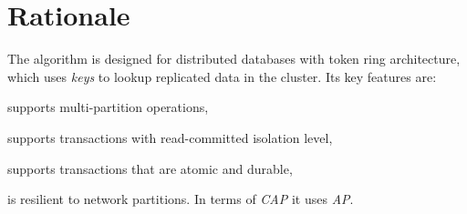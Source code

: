 
\section{Rationale}
The \mpt algorithm is designed for distributed databases with token ring architecture,
which uses \emph{keys} to lookup replicated data in the cluster. Its key features are: \begin{enumerate*}[label=\alph*)]
\item supports multi-partition operations,
\item supports transactions with read-committed isolation level,
\item supports transactions that are atomic and durable,
\item is resilient to network partitions. In terms of \emph{CAP} \cite{Brewer:2012ba} it uses \emph{AP}.
\end{enumerate*}
